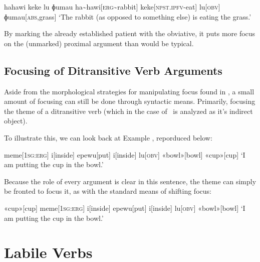 \ex
\begingl
\glpreamble hahawi keke lu ɸumau
\endpreamble
ha\textasciitilde hawi[\textsc{erg\textasciitilde}rabbit]
keke[\textsc{npst.ipfv-}eat]
lu[\textsc{obv}]
ɸumau[\textsc{abs,}grass]
\glft `The rabbit (as opposed to something else) is eating the grass.'
\endgl
\xe

By marking the already established patient with the obviative\footnotemark, it puts more focus on the (unmarked) proximal argument than would be typical.


\subsection{Focusing of Ditransitive Verb Arguments}\label{sec:ditrans_focus}

Aside from the morpho­logical strategies for manipulating focus found in , a small amount of focusing can still be done through syntactic means. Primarily, focusing the theme of a ditransitive verb (which in the case of \langname\ is analyzed as it's indirect object).

To illustrate this, we can look back at Example , reporduced below:

\ex
\begingl
\glpreamble
\pronounced{}\endpreamble
meme[\textsc{1sg:erg}]
i[inside]
epewu[put]
i[inside]
lu[\textsc{obv}]
«bowl»[bowl]
«cup»[cup]
\glft `I am putting the cup in the bowl.'
\endgl
\xe

Because the role of every argument is clear in this sentence, the theme can simply be fronted to focus it, as with the standard means of shifting focus:

\ex
\begingl
\glpreamble
\pronounced{}\endpreamble
«cup»[cup]
meme[\textsc{1sg:erg}]
i[inside]
epewu[put]
i[inside]
lu[\textsc{obv}]
«bowl»[bowl]
\glft `I am putting the cup in the bowl.'\footnotemark
\endgl
\xe


\section{Labile Verbs}\label{sec:labile_verbs}

